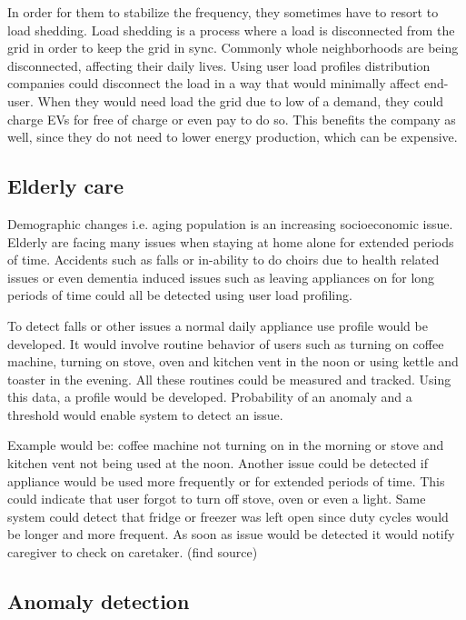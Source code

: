 \documentclass[
11pt, %
english, %
singlespacing, %
headsepline, %
]{MastersDoctoralThesis} %
\begin{document}
In order for them to stabilize the frequency, they sometimes have to resort to load shedding.
Load shedding is a process where a load is disconnected from the grid in order to keep the grid in sync.
Commonly whole neighborhoods are being disconnected, affecting their daily lives.
Using user load profiles distribution companies could disconnect the load in a way that would minimally affect end-user. 
When they would need load the grid due to low of a demand, they could charge EVs for free of charge or even pay to do so. 
This benefits the company as well, since they do not need to lower energy production, which can be expensive. 

\subsection{Elderly care}

Demographic changes i.e. aging population is an increasing socioeconomic issue.
Elderly are facing many issues when staying at home alone for extended periods of time.
Accidents such as falls or in-ability to do choirs due to health related issues or even dementia induced issues 
such as leaving appliances on for long periods of time could all be detected using user load profiling.

To detect falls or other issues a normal daily appliance use profile would be developed.
It would involve routine behavior of users such as turning on coffee machine, turning on stove, oven and kitchen vent in the noon or using kettle and toaster in the evening.
All these routines could be measured and tracked. Using this data, a profile would be developed.
Probability of an anomaly and a threshold would enable system to detect an issue.

Example would be: coffee machine not turning on in the morning or stove and kitchen vent not being used at the noon.
Another issue could be detected if appliance would be used more frequently or for extended periods of time. 
This could indicate that user forgot to turn off stove, oven or even a light. Same system could detect 
that fridge or freezer was left open since duty cycles would be longer and more frequent. 
As soon as issue would be detected it would notify caregiver to check on caretaker. (find source)

\subsection{Anomaly detection}
\end{document}
